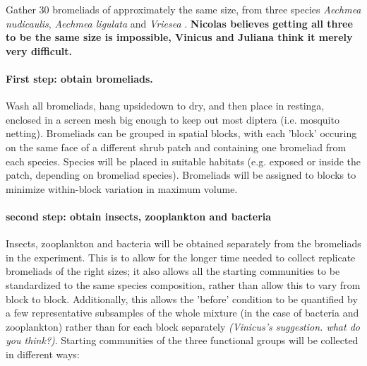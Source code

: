 \documentclass[10pt]{article}
\begin{document}
\begin{spacing}{2}
Gather 30 bromeliads of approximately the same size, from three
species \emph{Aechmea nudicaulis}, \emph{Aechmea ligulata} and
\emph{Vriesea }.  \textbf{Nicolas believes getting all three to be the same
size is impossible, Vinicus and Juliana think it merely very
difficult.}

\paragraph{First step: obtain bromeliads.}

Wash all bromeliads, hang upsidedown to dry, and then place in
restinga, enclosed in a screen mesh big enough to keep out most
diptera (i.e. mosquito netting).  Bromeliads can be grouped in spatial
blocks, with each 'block' occuring on the same face of a different
shrub patch and containing one bromeliad from each species.  Species
will be placed in suitable habitats (e.g. exposed or inside the patch,
depending on bromeliad species). Bromeliads will be assigned to blocks
to minimize within-block variation in maximum volume.

\paragraph{second step: obtain insects, zooplankton and bacteria}

Insects, zooplankton and bacteria will be obtained separately from the
bromeliads in the experiment.  This is to allow for the longer time
needed to collect replicate bromeliads of the right sizes; it also
allows all the starting communities to be standardized to the same
species composition, rather than allow this to vary from block to
block.  Additionally, this allows the 'before' condition to be
quantified by a few representative subsamples of the whole mixture (in
the case of bacteria and zooplankton) rather than for each block
separately \emph{(Vinicus's suggestion.  what do you think?)}.
Starting communities of the three functional groups will be collected
in different ways:


\end{spacing}
\end{document}

